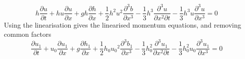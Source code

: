 \documentclass[12pt]{article}
\begin{document}
%
\[h\frac{\partial {u}}{\partial t} +  h{u}\frac{\partial {u}}{\partial x} + gh\frac{\partial h}{\partial x} + \frac{1}{2}h^2 {u}^2\frac{\partial^3 b}{\partial x^3}   - \frac{1}{3}h^3  \frac{\partial^3 {u}}{\partial x^2 \partial t}  - \frac{1}{3}h^3 {u}  \frac{\partial^3 {u}}{\partial x^3} = 0\]
%
Using the linearisation gives the linearised momentum equations, and removing common factors
%
\begin{equation}
\label{eqnSerrelinearmomentum}
\frac{\partial {u_1}}{\partial t} +  {u_0}\frac{\partial {u_1}}{\partial x} + g\frac{\partial h_1}{\partial x} + \frac{1}{2}h_0{u_0}^2\frac{\partial^3 b_1}{\partial x^3}   - \frac{1}{3}h_0^2  \frac{\partial^3 {u_1}}{\partial x^2 \partial t}  - \frac{1}{3}h_0^2 {u_0}  \frac{\partial^3 {u_1}}{\partial x^3} = 0
\end{equation} \\
\end{document}
